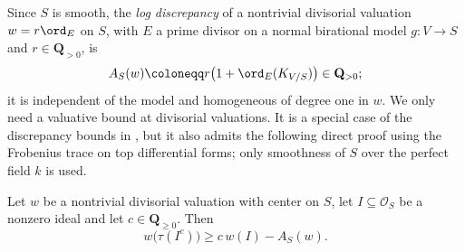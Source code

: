 \documentclass[11pt,a4paper]{article}
\begin{document}
Since $S$ is smooth, the \emph{log discrepancy} of a nontrivial divisorial valuation $w=r\ord_E$ on $S$, with $E$ a prime divisor on a normal birational model $g\colon V\to S$ and $r\in\mathbf Q_{>0}$, is
\[
 A_S(w)\coloneqq r\bigl(1+\ord_E(K_{V/S})\bigr)\in\mathbf{Q}_{>0};
\]
it is independent of the model and homogeneous of degree one in $w$. We only need a valuative bound at divisorial valuations. It is a special case of the discrepancy bounds in \cite{Canton}, but it also admits the following direct proof using the Frobenius trace on top differential forms; only smoothness of $S$ over the perfect field $k$ is used.

\begin{lemma}\label{lem:divisorial-trace-estimate}
Let $w$ be a nontrivial divisorial valuation with center on $S$, let $I\subseteq\mathcal{O}_S$ be a nonzero ideal and let $c\in\mathbf Q_{\geq0}$.  Then
\begin{equation}\label{eq:divisorial-test-bound}
 w\bigl(\tau(I^c)\bigr)\geq c\,w(I)-A_S(w).
\end{equation}
\end{lemma}
\end{document}
